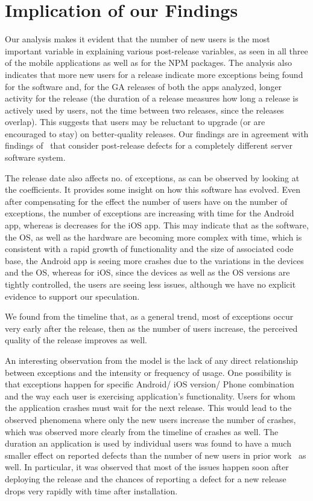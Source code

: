 \documentclass[smallextended]{svjour3}       %
\begin{document}
\vspace{-10pt}
\section{Implication of our Findings}\label{s:implication}

Our analysis makes it evident that the number of new
users  is the most important variable in explaining various post-release variables, as seen in all three of the mobile applications as well as for the NPM packages. 
The analysis also indicates that more new users for a release indicate 
more exceptions being found for the software
and, for the GA releases of both the apps analyzed, longer activity for the release (the duration
of a release measures how long a release is actively used by users,
not the time between two releases, since the releases overlap).  This
suggests that users  may 
 be reluctant to upgrade (or are encouraged to stay) on better-quality releases.
 Our findings are in agreement with findings
of~\cite{IQ08,hmps15,mockus2005predictors} that consider 
post-release defects for a completely different server software system.

The release date also affects no. of exceptions, as can be observed by looking 
at the coefficients. It provides some insight on
how this software has evolved.  
Even after compensating for the effect the number of
users have on the number of exceptions, the number of exceptions are
increasing with time for the Android app, whereas is decreases for the iOS app. 
This may indicate that as the software, the OS, as well as the hardware are becoming 
more complex with time, which is consistent with a rapid growth of
functionality and the size of associated code base, the Android app is seeing more crashes due to the variations in the devices and the OS, whereas for iOS, since the devices as well as the OS versions are tightly controlled, the users are seeing less issues,   although we have no explicit evidence to support our speculation. 

We found from the timeline that, as a general trend, most of exceptions occur very early after the release, then as the number of users increase, the perceived quality of the release improves as well.


An interesting observation from the model is the lack of any direct relationship 
between exceptions and the intensity or frequency of usage.
One possibility is that exceptions happen for specific Android/
iOS version/ Phone combination and the way each user is exercising application's
functionality. Users for whom the application crashes must wait for
the next release. This would lead to the observed phenomena where
only the new users increase the number of crashes, which was observed more 
clearly from the timeline of crashes as well. The duration 
an application is used by individual users was found to have a much
smaller effect on reported defects than the number of
new users in prior work~\cite{hmps15,IQ08,MZL05} as well. In particular, it was observed
that most of the issues happen soon after deploying the release 
and the chances of reporting a defect for a new release drops 
very rapidly with time after installation.
\end{document}
